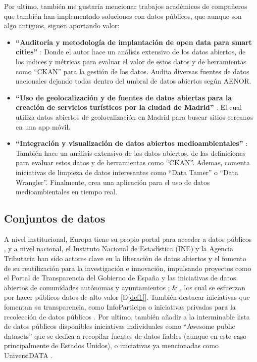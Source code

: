 	Por ultimo, también me gustaría mencionar trabajos académicos de compañeros que también han implementado soluciones con datos públicos, que aunque son algo antiguos, siguen aportando valor:
	
	\begin{itemize}
			\item \textbf{``Auditoría y metodología de implantación de open data para smart cities''} \citep{MelendrezMoreto2016Auditoria}: Donde el autor hace un análisis extensivo de los datos abiertos, de los indices y métricas para evaluar el valor de estos datos y de herramientas como ``CKAN'' para la gestión de los datos. Audita diversas fuentes de datos nacionales dejando todas dentro del umbral de datos abiertos según AENOR. 
			
			\item \textbf{``Uso de geolocalización y de fuentes de datos abiertas para la creación de servicios turísticos por la ciudad de Madrid''} \citep{LLamoccaPortela2016Integracion}: El cual utiliza datos abiertos de geolocalización en Madrid para buscar sitios cercanos en una app móvil.
			
			\item \textbf{``Integración y visualización de datos abiertos medioambientales''} \citep{ArellanoBruno2019UsoDeGeolocalizacion}: También hace un análisis extensivo de los datos abiertos, de las definiciones para evaluar estos datos y de herramientas como ``CKAN''. Ademas, comenta iniciativas de limpieza de datos interesantes como ``Data Tamer'' o ``Data Wrangler''. Finalmente, crea una aplicación para el uso de datos medioambientales en tiempo real.
	\end{itemize}
	
	\subsection{Conjuntos de datos}
	
	A nivel institucional, Europa tiene su propio portal para acceder a datos públicos \citep{PortalDatosEuropa}, y a nivel nacional, el Instituto Nacional de Estadística (INE) y la Agencia Tributaria han sido actores clave en la liberación de datos abiertos y el fomento de su reutilización para la investigación e innovación, impulsando proyectos como el Portal de Transparencia del Gobierno de España y las iniciativas de datos abiertos de comunidades autónomas y ayuntamientos \citep{PortalDatosGob}; \citep{PortalDatosMadrid} \& \citep{PortalRegistradores}, los cual se esfuerzan por hacer públicos datos de alto valor [D\ref{def1}]. También destacar iniciativas que fomentan su transparencia, como InfoParticipa \citep{PortalInfoparticipa} o iniciativas privadas para la recolección de datos públicos \citep{PortalEsriEspanna}. Por ultimo, también añadir a la interminable lista de datos públicos disponibles iniciativas individuales como ``Awesome public datasets'' \citep{awesomePublicDatasets} que se dedica a recopilar fuentes de datos fiables (aunque en este caso principalmente de Estados Unidos), o iniciativas ya mencionadas como UniversiDATA \citep{UniversiDATA}.
	
